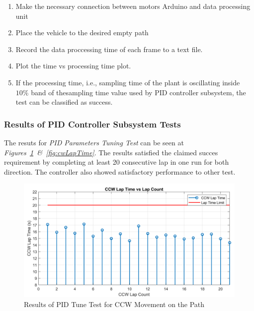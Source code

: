 \documentclass[a4paper,12pt]{article}
\begin{document}
\begin{enumerate}
	\begin{enumerate}
		\item Make the necessary connection between motors Arduino and data processing unit  
		\item Place the vehicle to the desired empty path   
		\item Record the data proccessing time of each frame to a text file.
		\item Plot the time vs processing time plot.
		\item If the processing time, i.e., sampling time of the plant is oscillating inside $10\%$ band of thesampling time value used by PID controller subsystem, the test can be classified as success.
	\end{enumerate}
		
\end{enumerate}
	
	
	\subsubsection*{Results of PID Controller Subsystem Tests}
	
	The resuts for \textit{PID Parameters Tuning Test} can be seen at \textit{Figures~\ref{fig:ccwLapTime}~\&~\ref{fig:cwLapTime}}. The results satisfied the claimed succes requirement by completing at least 20 consecutive lap in one run for both direction. The controller also showed satisfactory performance to other test.
	
	\begin{figure}[H]
		\includegraphics[width=\textwidth,center]{images/ROT_ROI/ccwLapTime_crop}
		\caption{\label{fig:ccwLapTime} Results of PID Tune Test for CCW Movement on the Path}
	\end{figure}
	
\end{document}
